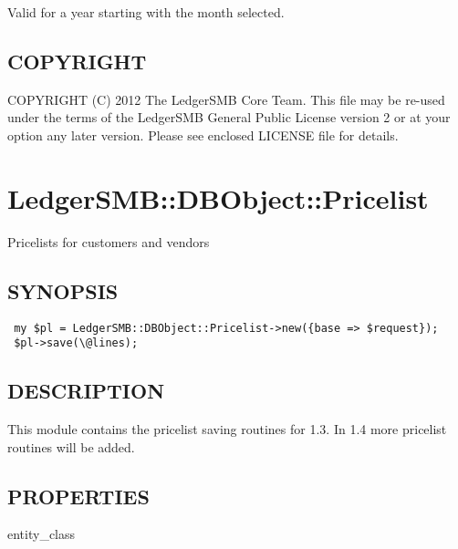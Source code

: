 \begin{description}
\begin{description}
\begin{description}
\begin{description}
\begin{description}
\begin{description}
\begin{description}
\begin{description}
\begin{description}
\begin{description}
\begin{description}
\begin{description}
Valid for a year starting with the month selected.

\end{description}
\end{description}
\subsection*{COPYRIGHT\label{LedgerSMB::DBObject::Report_COPYRIGHT}}


COPYRIGHT (C) 2012 The LedgerSMB Core Team.  This file may be re-used under the
terms of the LedgerSMB General Public License version 2 or at your option any
later version.  Please see enclosed LICENSE file for details.

\section{LedgerSMB::DBObject::Pricelist\label{LedgerSMB::DBObject::Pricelist}}


Pricelists for customers and vendors

\subsection*{SYNOPSIS\label{LedgerSMB::DBObject::Pricelist_SYNOPSIS}}
\begin{verbatim}
 my $pl = LedgerSMB::DBObject::Pricelist->new({base => $request});
 $pl->save(\@lines);
\end{verbatim}
\subsection*{DESCRIPTION\label{LedgerSMB::DBObject::Pricelist_DESCRIPTION}}


This module contains the pricelist saving routines for 1.3.  In 1.4 more
pricelist routines will be added.

\subsection*{PROPERTIES\label{LedgerSMB::DBObject::Pricelist_PROPERTIES}}
\begin{description}

\item[{entity\_class}] \mbox{}


\end{description}
\end{description}
\end{description}
\end{description}
\end{description}
\end{description}
\end{description}
\end{description}
\end{description}
\end{description}
\end{description}
